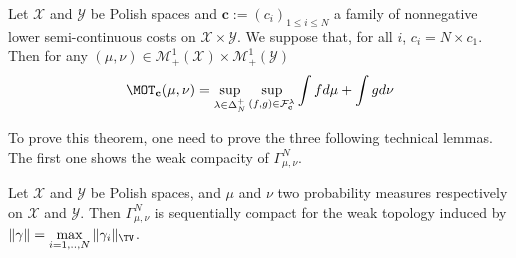  



\begin{prop}
\label{prop:duality-max}
Let $\mathcal{X}$ and $\mathcal{Y}$ be Polish spaces and $\mathbf{c}:=(c_i)_{1\leq i\leq N}$ a family of nonnegative lower semi-continuous costs on $\mathcal{X}\times \mathcal{Y}$. We suppose that, for all $i$, $c_i= N\times c_1$. Then for any $(\mu,\nu)\in\mathcal{M}_+^{1}(\mathcal{X})\times\mathcal{M}_+^{1}(\mathcal{Y})$  
\begin{align}
    \MOT_{\mathbf{c}}(\mu,\nu) =\sup_{\lambda\in\Delta_N^+}\sup_{(f,g)\in\mathcal{F}^\lambda_\mathbf{c}}\int fd\mu+ \int gd\nu
\end{align} 
\end{prop}

To prove this theorem, one need to prove the three following technical lemmas. The first one shows the weak compacity of $\Gamma^N_{\mu,\nu}$.

\begin{lemma}
\label{lem:compact-weak}
Let $\mathcal{X}$ and $\mathcal{Y}$ be Polish spaces, and $\mu$ and $\nu$ two probability measures respectively on  $\mathcal{X}$ and $\mathcal{Y}$. Then $\Gamma^N_{\mu,\nu}$  is sequentially compact for the weak topology induced by $\Vert \gamma \Vert = \max\limits_{i=1,..,N} \Vert \gamma_i\Vert_{\TV}$. 
\end{lemma}


